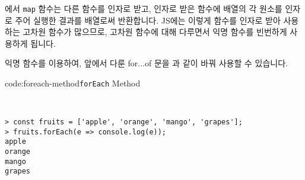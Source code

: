 에서 \texttt{map} 함수는 다른 함수를 인자로 받고, 인자로 받은 함수에 배열의 각 원소를 인자로 주어 실행한 결과를 배열로써 반환합니다. JS에는 이렇게 함수를 인자로 받아 사용하는 고차원 함수가 많으므로, 고차원 함수에 대해 다루면서 익명 함수를 빈번하게 사용하게 됩니다. 

익명 함수를 이용하여, 앞에서 다룬 for...of 문을 과 같이 바꿔 사용할 수 있습니다. 

\begin{codeenv}{code:foreach-method}{\texttt{forEach} Method}\begin{verbatim}


> const fruits = ['apple', 'orange', 'mango', 'grapes'];
> fruits.forEach(e => console.log(e));
apple
orange
mango
grapes
\end{verbatim}
\end{codeenv}
